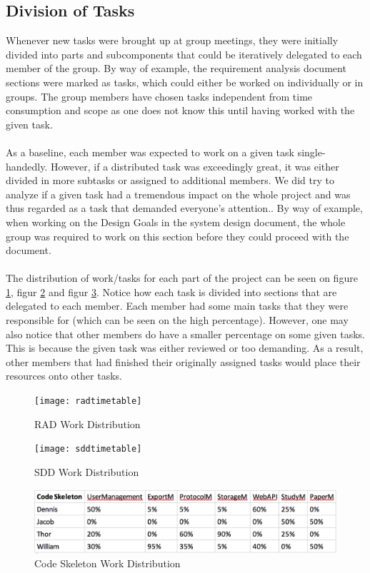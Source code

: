 \subsection{Division of Tasks}

Whenever new tasks were brought up at group meetings, they were initially divided into parts and subcomponents that could be iteratively delegated to each member of the group. By way of example, the requirement analysis document sections were marked as tasks, which could either be worked on individually or in groups. The group members have chosen tasks independent from time consumption and scope as one does not know this until having worked with the given task.
\\\\
As a baseline, each member was expected to work on a given task single-handedly. However, if a distributed task was exceedingly great, it was either divided in more subtasks or assigned to additional members. We did try to analyze if a given task had a tremendous impact on the whole project and was thus regarded as a task that demanded everyone's attention.. By way of example, when working on the Design Goals in the system design document, the whole group was required to work on this section before they could proceed with the document. 
\\\\
The distribution of work/tasks for each part of the project can be seen on figure \ref{fig:rad}, figur \ref{fig:sdd} and figur \ref{fig:codeskeleton}. Notice how each task is divided into sections that are delegated to each member. Each member had some main tasks that they were responsible for (which can be seen on the high percentage). However, one may also notice that other members do have a smaller percentage on some given tasks. This is because the given task was either reviewed or too demanding. As a result, other members that had finished their originally assigned tasks would place their resources onto other tasks.

\begin{figure}[H]
	\centering
	\texttt{[image: radtimetable]}
	\caption{RAD Work Distribution}
	\label{fig:rad}
\end{figure}

\begin{figure}[H]
	\centering
	\texttt{[image: sddtimetable]}
	\caption{SDD Work Distribution}
	\label{fig:sdd}
\end{figure}

\begin{figure}[H]
	\centering
	\includegraphics[width=150mm]{image/skeletontimetable}
	\caption{Code Skeleton Work Distribution}
	\label{fig:codeskeleton} %
\end{figure}
